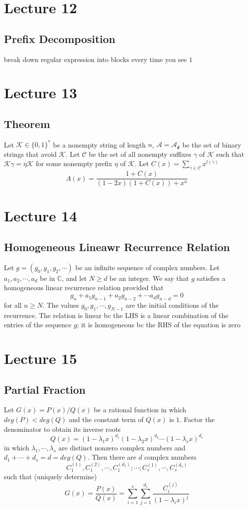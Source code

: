 \documentclass[11pt]{article}
\newcommand{\C}{{\mathbb{C}}}
\begin{document}
\section{Lecture 12}
\subsection{Prefix Decomposition}
break down regular expression into blocks every time you see $1$

\section{Lecture 13}
\subsection{Theorem}
Let $\mathcal{K}\in\{0,1\}^*$ be a nonempty string of length $n$, $\mathcal{A}=\mathcal{A}_\mathcal{k}$ be the set of binary strings that avoid $\mathcal{K}$.
Let $\mathcal{C}$ be the set of all nonempty suffixes $\gamma$ of $\mathcal{K}$ such that $\mathcal{K}\gamma = \eta\mathcal{K}$ for some nonempty prefix $\eta$ of $\mathcal{K}$.
Let $C(x) = \sum_{\gamma\in\mathcal{C}}x^{l(\gamma)}$
\[A(x) = \dfrac{1+C(x)}{(1-2x)(1+C(x))+x^n}\]

\section{Lecture 14}
\subsection{Homogeneous Lineawr Recurrence Relation}
Let $g=(g_0,g_1,g_2,\cdots)$ be an infinite sequence of complex numbers.
Let $a_1,a_2,\cdots,a_d$ be in $\C$, and let $N\geq d$ be an integer. We say that 
$g$ satisfies a homogeneous linear recurrence relation provided that
\[g_n + a_1g_{n-1} + a_2g_{n-2}+\cdots a_dg_{n-d} = 0\]
for all $n\geq N$. The values $g_0,g_1,\cdots,g_{N-1}$ are the initial conditions of the recurrence. The relation is linear bc the LHS is a linear combination of the entries of the sequence $g$; it is 
homogeneous bc the RHS of the equation is zero

\section{Lecture 15}
\subsection{Partial Fraction}
Let $G(x) = P(x)/Q(x)$ be a rational function in which $deg(P)<deg(Q)$ and the constant term of $Q(x)$ is $1$. Factor the denominator to obtain its inverse roots
\[Q(x) = (1-\lambda_1x)^{d_1}(1-\lambda_2x)^{d_2}\cdots(1-\lambda_sx)^{d_s}\]
in which $\lambda_1,\cdots,\lambda_s$ are distinct nonzero complex numbers and $d_1+\cdots+d_s = d = deg(Q)$. Then there are $d$ complex numbers 
\[C_1^{(1)},C_1^{(2)},\cdots,C_1^{(d_1)};\cdots;C_s^{(1)},\cdots,C_s^{(d_s)}\]
such that (uniquely determine)
\[G(x) = \dfrac{P(x)}{Q(x)} = \sum_{i=1}^{s}\sum_{j=1}^{d_s}\dfrac{C_i^{(j)}}{(1-\lambda_ix)^j}\]
\end{document}
